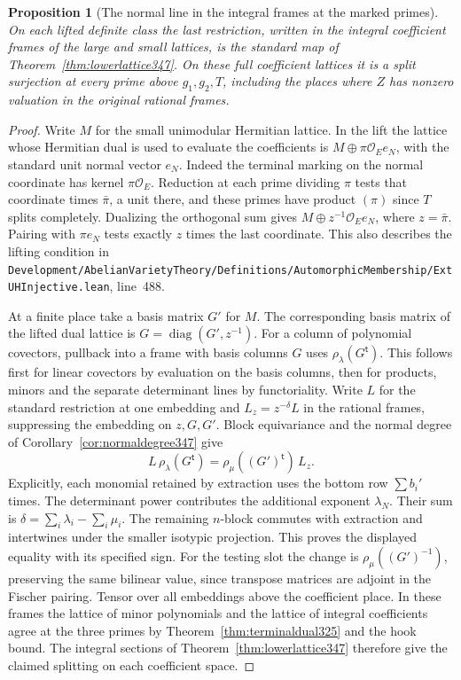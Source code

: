 \documentclass[a4paper,11pt]{article}
\newtheorem{proposition}{Proposition}[section]
\theoremstyle{definition}
\theoremstyle{remark}
\newcommand{\srcloc}[2]{{\small\nolinkurl{#1.lean}}, line~#2}
\numberwithin{equation}{section}
\begin{document}
\begin{proposition}[The normal line in the integral frames at the marked primes]\leavevmode
\label{prop:normalframe349}
On each lifted definite class the last restriction, written in the
integral coefficient frames of the large and small lattices, is
the standard map of Theorem~\ref{thm:lowerlattice347}. On these
full coefficient lattices it is a split surjection at every
prime above \(g_1,g_2,T\), including the places where \(Z\) has
nonzero valuation in the original rational frames.
\end{proposition}
\begin{proof}
Write \(M\) for the small unimodular Hermitian lattice. In the
lift the lattice whose Hermitian dual is used to evaluate the
coefficients is \(M\oplus\pi\mathcal O_E e_N\), with the standard
unit normal vector \(e_N\). Indeed the terminal marking on the
normal coordinate has kernel \(\pi\mathcal O_E\). Reduction at
each prime dividing \(\pi\) tests that coordinate times
\(\bar\pi\), a unit there, and these primes have product
\((\pi)\) since \(T\) splits completely. Dualizing the orthogonal
sum gives \(M\oplus z^{-1}\mathcal O_E e_N\), where
\(z=\bar\pi\). Pairing with \(\pi e_N\) tests exactly
\(z\) times the last coordinate. This also describes the
lifting condition in
\srcloc{Development/AbelianVarietyTheory/Definitions/AutomorphicMembership/ExtUHInjective}{488}.

At a finite place take a basis matrix \(G'\) for \(M\).
The corresponding basis matrix of the lifted dual lattice is
\(G=\operatorname{diag}(G',z^{-1})\).
For a column of polynomial covectors, pullback into a frame
with basis columns \(G\) uses \(\rho_\lambda(G^{\mathsf t})\).
This follows first for linear covectors by evaluation on the
basis columns, then for products, minors and the separate
determinant lines by functoriality. Write \(L\) for the
standard restriction at one embedding and \(L_z=z^{-\delta}L\)
in the rational frames, suppressing the embedding on \(z,G,G'\).
Block equivariance and the normal degree of
Corollary~\ref{cor:normaldegree347} give
\[
          L\,\rho_\lambda(G^{\mathsf t})
                =\rho_\mu((G')^{\mathsf t})\,L_z .
\]
Explicitly, each monomial retained by extraction uses the bottom
row \(\sum b_i'\) times. The determinant power contributes
the additional exponent \(\lambda_N\). Their sum is
\(\delta=\sum_i\lambda_i-\sum_i\mu_i\). The remaining
\(n\)-block commutes with extraction and intertwines under
the smaller isotypic projection. This proves the displayed equality
with its specified sign. For the testing slot the change is
\(\rho_\mu((G')^{-1})\), preserving the same bilinear value,
since transpose matrices are adjoint in the Fischer pairing.
Tensor over all embeddings above the coefficient place.
In these frames the lattice of minor polynomials and the lattice
of integral coefficients agree at the three primes by
Theorem~\ref{thm:terminaldual325} and the hook bound.
The integral sections of Theorem~\ref{thm:lowerlattice347}
therefore give the claimed splitting on each coefficient space.
\end{proof}
\end{document}
